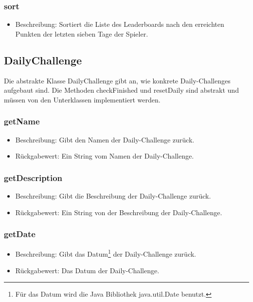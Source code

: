\documentclass[a4paper]{scrreprt}
\begin{document}
    \subsubsection{sort}
    \begin{itemize}
        \item Beschreibung: Sortiert die Liste des Leaderboards nach den erreichten Punkten der letzten sieben Tage der Spieler.
    \end{itemize}


    \subsection{DailyChallenge}
    Die abstrakte Klasse DailyChallenge gibt an, wie konkrete Daily-Challenges aufgebaut sind. Die Methoden checkFinished und resetDaily sind abstrakt und müssen von den Unterklassen implementiert werden. \\

    \subsubsection{getName}
    \begin{itemize}
        \item Beschreibung: Gibt den Namen der Daily-Challenge zurück.
        \item Rückgabewert: Ein String vom Namen der Daily-Challenge.
    \end{itemize}
    \subsubsection{getDescription}
    \begin{itemize}
        \item Beschreibung: Gibt die Beschreibung der Daily-Challenge zurück.
        \item Rückgabewert: Ein String von der Beschreibung der Daily-Challenge.
    \end{itemize}
    \subsubsection{getDate}
    \begin{itemize}
        \item Beschreibung: Gibt das Datum\footnote{Für das Datum wird die Java Bibliothek java.util.Date benutzt.} der Daily-Challenge zurück.
        \item Rückgabewert: Das Datum der Daily-Challenge.
    \end{itemize}
\end{document}
